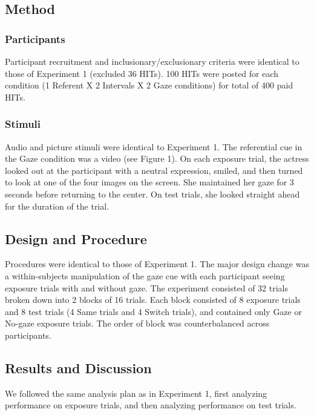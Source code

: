 \documentclass[authoryear, review]{elsarticle}
\begin{document}
\subsection{Method}\label{method-1}

\subsubsection{Participants}\label{participants-1}

Participant recruitment and inclusionary/exclusionary criteria were
identical to those of Experiment 1 (excluded 36 HITs). 100 HITs were
posted for each condition (1 Referent X 2 Intervals X 2 Gaze conditions)
for total of 400 paid HITs.

\subsubsection{Stimuli}\label{stimuli-1}

Audio and picture stimuli were identical to Experiment 1. The
referential cue in the Gaze condition was a video (see Figure 1). On
each exposure trial, the actress looked out at the participant with a
neutral expression, smiled, and then turned to look at one of the four
images on the screen. She maintained her gaze for 3 seconds before
returning to the center. On test trials, she looked straight ahead for
the duration of the trial.

\subsection{Design and Procedure}\label{design-and-procedure-1}

Procedures were identical to those of Experiment 1. The major design
change was a within-subjects manipulation of the gaze cue with each
participant seeing exposure trials with and without gaze. The experiment
consisted of 32 trials broken down into 2 blocks of 16 trials. Each
block consisted of 8 exposure trials and 8 test trials (4 Same trials
and 4 Switch trials), and contained only Gaze or No-gaze exposure
trials. The order of block was counterbalanced across participants.

\subsection{Results and Discussion}\label{results-and-discussion-1}

We followed the same analysis plan as in Experiment 1, first analyzing
performance on exposure trials, and then analyzing performance on test
trials.
\end{document}
